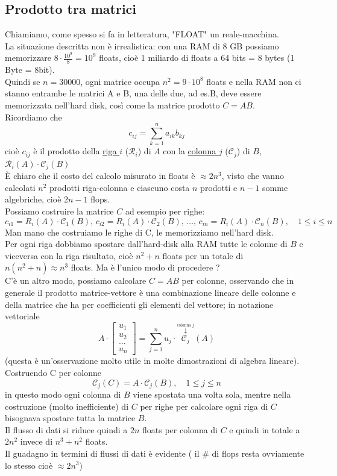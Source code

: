 \documentclass[12pt]{article}
\begin{document}
\subsection{Prodotto tra matrici}
Chiamiamo, come spesso si fa in letteratura, "FLOAT" un reale-macchina.\\
La situazione descritta non è irrealistica: con una RAM di 8 GB possiamo memorizzare $8\cdot \frac{10^9}{8}=10^9$ floats, cioè 1 miliardo di floats a 64 bits = 8 bytes (1 Byte = 8bit).\\
Quindi se $n=30000$, ogni matrice occupa $n^2=9\cdot 10^8$ floats e nella RAM non ci stanno entrambe le matrici A e B, una delle due, ad es.B, deve essere memorizzata nell'hard disk, così come la matrice prodotto $C=AB$.\\
Ricordiamo che 
\[ c_{ij}=\sum_{k=1}^n a_{ik}b_{kj} \]
cioè $c_{ij}$ è il prodotto della \uline{riga $i$} ($\mathcal{R}_{i}$) di $A$ con la \uline{colonna $j$} ($\mathcal{C}_{j}$) di $B$, $\mathcal{R}_{i}(A)\cdot \mathcal{C}_{j}(B)$\\
È chiaro che il costo del calcolo misurato in floats è $\approx 2n^3$, visto che vanno calcolati $n^2$ prodotti riga-colonna e ciascuno costa $n$ prodotti e $n-1$ somme algebriche, cioè $2n-1$ flops. \\
Possiamo costruire la matrice $C$ ad esempio per righe: \\
\[c_{i1} = R_i(A)\cdot\mathcal{C}_1(B),\,c_{i2} = R_i(A)\cdot\mathcal{C}_2(B),\, \dotsc ,\, c_{in} = R_i(A)\cdot\mathcal{C}_n(B),\quad 1 \le i \le n\]
Man mano che costruiamo le righe di C, le memorizziamo nell'hard disk. \\
Per ogni riga dobbiamo spostare dall'hard-disk alla RAM tutte le colonne di $B$ e viceversa con la riga risultato, cioè $n^2+n$ floats per un totale di $n(n^2+n) \approx n^3$ floats. Ma è l'unico modo di procedere ? \\
C'è un altro modo, possiamo calcolare $C=AB$ per colonne, osservando che in generale il prodotto matrice-vettore è una combinazione lineare delle colonne e della matrice che ha per coefficienti gli elementi del vettore; in notazione vettoriale \\
\[A \cdot \begin{bmatrix} u_1 \\ u_2 \\ ... \\ u_n \end{bmatrix} = \sum_{j=1}^{n} u_j \cdot \overset{\overset{\text{colonna $j$}}{\downarrow}}{\mathcal{C}_j}(A) \]
(questa è un'osservazione molto utile in molte dimostrazioni di algebra lineare).\\
Costruendo C per colonne 
\[\mathcal{C}_j(C) = A\cdot \mathcal{C}_j(B),\quad 1 \le j \le n\]
in questo modo ogni colonna di $B$ viene spostata una volta sola, mentre nella costruzione (molto inefficiente) di $C$ per righe per calcolare ogni riga di $C$ bisognava spostare tutta la matrice $B$.\\
Il flusso di dati si riduce quindi a $2n$ floats per colonna di $C$ e quindi in totale a $2n^2$ invece di $n^3+n^2$ floats.\\
Il guadagno in termini di flussi di dati è evidente ( il \# di flops resta ovviamente lo stesso cioè $\approx 2n^3$)
\end{document}

